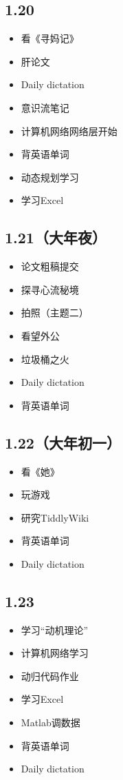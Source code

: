 \documentclass[UTF8]{ctexart}
\begin{document}
\subsection*{1.20}
\begin{itemize}
    \item 看《寻妈记》
    \item 肝论文
    \item Daily dictation
    \item 意识流笔记
    \item 计算机网络网络层开始
    \item 背英语单词
    \item 动态规划学习
    \item 学习Excel
\end{itemize}
\subsection*{1.21（大年夜）}
\begin{itemize}
    \item 论文粗稿提交
    \item 探寻心流秘境
    \item 拍照（主题二）
    \item 看望外公
    \item 垃圾桶之火
    \item Daily dictation
    \item 背英语单词
\end{itemize}
\subsection*{1.22（大年初一）}
\begin{itemize}
    \item 看《她》
    \item 玩游戏
    \item 研究TiddlyWiki
    \item 背英语单词
    \item Daily dictation
\end{itemize}
\subsection*{1.23}
\begin{itemize}
    \item 学习“动机理论”
    \item 计算机网络学习
    \item 动归代码作业
    \item 学习Excel
    \item Matlab调数据
    \item 背英语单词
    \item Daily dictation
\end{itemize}
\end{document}
